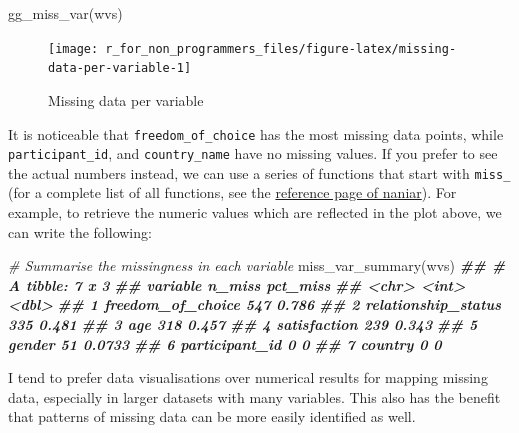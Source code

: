 \documentclass[
]{book}
\newenvironment{Shaded}{\begin{snugshade}}{\end{snugshade}}
\newcommand{\CommentTok}[1]{\textcolor[rgb]{0.56,0.35,0.01}{\textit{#1}}}
\newcommand{\DocumentationTok}[1]{\textcolor[rgb]{0.56,0.35,0.01}{\textbf{\textit{#1}}}}
\newcommand{\FunctionTok}[1]{\textcolor[rgb]{0.00,0.00,0.00}{#1}}
\newcommand{\NormalTok}[1]{#1}
\begin{document}
\begin{Shaded}
\begin{Highlighting}[]
\FunctionTok{gg\_miss\_var}\NormalTok{(wvs)}
\end{Highlighting}
\end{Shaded}

\begin{figure}

{\centering \texttt{[image: r\_for\_non\_programmers\_files/figure-latex/missing-data-per-variable-1]} 

}

\caption{Missing data per variable}\label{fig:missing-data-per-variable}
\end{figure}

It is noticeable that \texttt{freedom\_of\_choice} has the most missing data points, while \texttt{participant\_id}, and \texttt{country\_name} have no missing values. If you prefer to see the actual numbers instead, we can use a series of functions that start with \texttt{miss\_} (for a complete list of all functions, see the \href{https://naniar.njtierney.com/reference/index.html}{reference page of naniar}). For example, to retrieve the numeric values which are reflected in the plot above, we can write the following:

\begin{Shaded}
\begin{Highlighting}[]
\CommentTok{\# Summarise the missingness in each variable}
\FunctionTok{miss\_var\_summary}\NormalTok{(wvs)}
\DocumentationTok{\#\# \# A tibble: 7 x 3}
\DocumentationTok{\#\#   variable            n\_miss pct\_miss}
\DocumentationTok{\#\#   \textless{}chr\textgreater{}                \textless{}int\textgreater{}    \textless{}dbl\textgreater{}}
\DocumentationTok{\#\# 1 freedom\_of\_choice      547   0.786 }
\DocumentationTok{\#\# 2 relationship\_status    335   0.481 }
\DocumentationTok{\#\# 3 age                    318   0.457 }
\DocumentationTok{\#\# 4 satisfaction           239   0.343 }
\DocumentationTok{\#\# 5 gender                  51   0.0733}
\DocumentationTok{\#\# 6 participant\_id           0   0     }
\DocumentationTok{\#\# 7 country                  0   0}
\end{Highlighting}
\end{Shaded}

I tend to prefer data visualisations over numerical results for mapping missing data, especially in larger datasets with many variables. This also has the benefit that patterns of missing data can be more easily identified as well.
\end{document}
